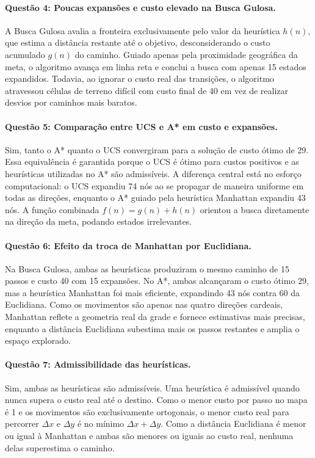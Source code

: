 \documentclass[12pt]{article}
\begin{document}
\paragraph{Questão 4: Poucas expansões e custo elevado na Busca Gulosa.}
A Busca Gulosa avalia a fronteira exclusivamente pelo valor da heurística $h(n)$, que estima a distância restante até o objetivo, desconsiderando o custo acumulado $g(n)$ do caminho. Guiado apenas pela proximidade geográfica da meta, o algoritmo avança em linha reta e conclui a busca com apenas 15 estados expandidos. Todavia, ao ignorar o custo real das transições, o algoritmo atravessou células de terreno difícil com custo final de 40 em vez de realizar desvios por caminhos mais baratos.

\paragraph{Questão 5: Comparação entre UCS e A* em custo e expansões.}
Sim, tanto o A* quanto o UCS convergiram para a solução de custo ótimo de 29. Essa equivalência é garantida porque o UCS é ótimo para custos positivos e as heurísticas utilizadas no A* são admissíveis. A diferença central está no esforço computacional: o UCS expandiu 74 nós ao se propagar de maneira uniforme em todas as direções, enquanto o A* guiado pela heurística Manhattan expandiu 43 nós. A função combinada $f(n) = g(n) + h(n)$ orientou a busca diretamente na direção da meta, podando estados irrelevantes.

\paragraph{Questão 6: Efeito da troca de Manhattan por Euclidiana.}
Na Busca Gulosa, ambas as heurísticas produziram o mesmo caminho de 15 passos e custo 40 com 15 expansões. No A*, ambas alcançaram o custo ótimo 29, mas a heurística Manhattan foi mais eficiente, expandindo 43 nós contra 60 da Euclidiana. Como os movimentos são apenas nas quatro direções cardeais, Manhattan reflete a geometria real da grade e fornece estimativas mais precisas, enquanto a distância Euclidiana subestima mais os passos restantes e amplia o espaço explorado.

\paragraph{Questão 7: Admissibilidade das heurísticas.}
Sim, ambas as heurísticas são admissíveis. Uma heurística é admissível quando nunca supera o custo real até o destino. Como o menor custo por passo no mapa é 1 e os movimentos são exclusivamente ortogonais, o menor custo real para percorrer $\Delta x$ e $\Delta y$ é no mínimo $\Delta x + \Delta y$. Como a distância Euclidiana é menor ou igual à Manhattan e ambas são menores ou iguais ao custo real, nenhuma delas superestima o caminho.
\end{document}
